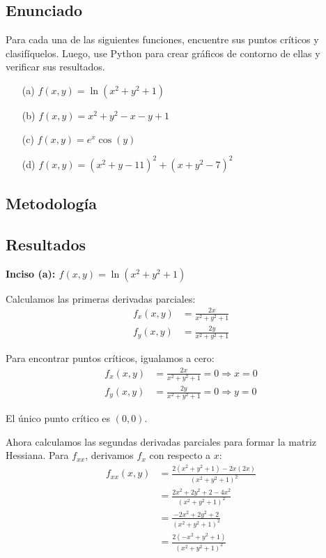 \documentclass{article}
\begin{document}
\subsection{Enunciado}
Para cada una de las siguientes funciones, encuentre sus puntos críticos y clasifíquelos. Luego, use Python para crear gráficos de contorno de ellas y verificar sus resultados.

\begin{enumerate}
  \item[(a)] $f(x,y) = \ln(x^{2} + y^{2} + 1)$
  \item[(b)] $f(x,y) = x^{2} + y^{2} - x - y + 1$
  \item[(c)] $f(x,y) = e^{x}\cos(y)$
  \item[(d)] $f(x,y) = (x^{2} + y - 11)^{2} + (x + y^{2} - 7)^{2}$
\end{enumerate}

\subsection{Metodología}

\subsection{Resultados}
\setcounter{equation}{0}

\textbf{Inciso (a): $f(x,y) = \ln(x^{2} + y^{2} + 1)$}

Calculamos las primeras derivadas parciales:
\begin{align}
f_x(x,y) &= \frac{2x}{x^2 + y^2 + 1} \\
f_y(x,y) &= \frac{2y}{x^2 + y^2 + 1}
\end{align}

Para encontrar puntos críticos, igualamos a cero:
\begin{align}
f_x(x,y) &= \frac{2x}{x^2 + y^2 + 1} = 0 \Rightarrow x = 0 \\
f_y(x,y) &= \frac{2y}{x^2 + y^2 + 1} = 0 \Rightarrow y = 0
\end{align}

El único punto crítico es $(0,0)$.

Ahora calculamos las segundas derivadas parciales para formar la matriz Hessiana. Para $f_{xx}$, derivamos $f_x$ con respecto a $x$:
\begin{align}
f_{xx}(x,y) &=  \frac{2(x^2 + y^2 + 1) - 2x(2x)}{(x^2 + y^2 + 1)^2} \\
&= \frac{2x^2 + 2y^2 + 2 - 4x^2}{(x^2 + y^2 + 1)^2} \\
&= \frac{-2x^2 + 2y^2 + 2}{(x^2 + y^2 + 1)^2} \\
&= \frac{2(-x^2 + y^2 + 1)}{(x^2 + y^2 + 1)^2}
\end{align}
\end{document}
